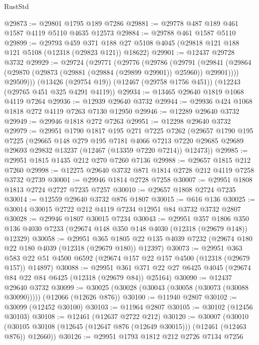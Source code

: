 \begin{lexlean}{RustStd}
\begin{coremodule}
@29873 := @29801 @1795 @189 @7286
@29881 := @29778 @487 @189 @461 @1587 @4119 @5110 @4635 @12573
@29884 := @29788 @461 @1587 @5110
@29899 := @29793
    @459
    @371
    @188
    @27
    @5108
    @4045
    (@29818 @121 @188 @121 @5108 (@12318 (@29823 @121)) @18622)
@29901 := @12437 @29728 @3732
@29929 := @29724
    (@29771
      (@29776
        (@29786
          (@29791
            (@29841 (@29864 (@29870 (@29873 (@29881 (@29884 (@29899 @29901)) @25960)) @29901))))
          @29509)))
    (@13426 (@29754 @19))
    (@12467 (@29758 @1756 @451))
    (@12243 (@29765 @451 @325 @4291 @4119))
@29934 := @13465 @29640 @1819 @1068 @4119 @7264
@29936 := @12939 @29640 @3732
@29944 := @29936 @424 @1068 @1818 @272 @4119 @7263 @7130 @12950
@29946 := @12289 @29640 @3732
@29949 := @29946 @1818 @272 @7263
@29951 := @12298 @29640 @3732
@29979 := @29951
    @1790
    @1817
    @195
    @271
    @7225
    @7262
    (@29657
      @1790
      @195
      @7225
      (@29665
        @148
        @279
        @195
        @7181
        @4066
        @7213
        @7220
        @29685
        @29689
        @29693
        @29832
        @13237
        (@12467 (@13359 @7220 @7214))
        @12473))
@29985 := @29951 @1815 @1435 @212 @270 @7260 @7136
@29988 := @29657 @1815 @212 @7260
@29998 := @12275 @29640 @3732 @871 @1814 @2728 @212 @4119 @7258 @3732 @2739
@30001 := @29946 @1814 @2728 @7258
@30007 := @29951 @1808 @1813 @2724 @2727 @7235 @7257
@30010 := @29657 @1808 @2724 @7235
@30014 := @12559 @29640 @3732 @876 @1807
@30015 := @616 @136
@30025 := @30014 @30015 @2722 @212 @4119 @7234 @12951 @84 @3732 @3732 @2807
@30028 := @29946 @1807 @30015 @7234
@30043 := @29951
    @357
    @1806
    @350
    @136
    @4030
    @7233
    (@29674 @148 @350 @148 @4030 (@12318 (@29679 @148)) @12329)
@30058 := @29951
    @365
    @1805
    @22
    @135
    @4039
    @7232
    (@29674 @180 @22 @180 @4039 (@12318 (@29679 @180)) @12397)
@30073 := @29951
    @363
    @583
    @22
    @51
    @4500
    @6592
    (@29674 @157 @22 @157 @4500 (@12318 (@29679 @157)) @14897)
@30088 := @29951
    @361
    @371
    @22
    @27
    @6425
    @4045
    (@29674 @84 @22 @84 @6425 (@12318 (@29679 @84)) @25164)
@30090 := @12437 @29640 @3732
@30099 := @30025 (@30028 (@30043 (@30058 (@30073 (@30088 @30090))))) (@12066 (@12626 @876))
@30100 := @11940 @2807
@30102 := @30099 (@12452 @30100)
@30103 := @11964 @2807
@30105 := @30102 (@12456 @30103)
@30108 := @12461 (@12637 @2722 @212)
@30120 := @30007
    (@30010 (@30105 @30108 (@12645 (@12647 @876 (@12649 @30015))) (@12461 (@12463 @876)) @12660))
@30126 := @29951 @1793 @1812 @212 @2726 @7134 @7256

\end{coremodule}
\end{lexlean}
